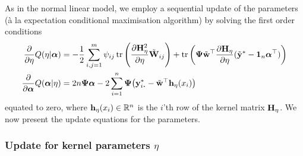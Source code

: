 As in the normal linear model, we employ a sequential update of the parameters (à la expectation conditional maximisation algorithm) by solving the first order conditions 
\begingroup
\setlength{\abovedisplayskip}{5pt}
\setlength{\belowdisplayskip}{8pt}
\begin{align}
  \frac{\partial}{\partial\eta}Q(\eta|\balpha)
  &= -\half \sum_{i,j=1}^m \psi_{ij} \tr \left( \frac{\partial \bH_\eta^2}{\partial\eta} \tilde\bW_{ij} \right) 
  + \tr\left( \bPsi \tilde\bw^\top  \frac{\partial \bH_\eta}{\partial\eta} (\tilde\by^* - \bone_n\balpha^\top)  \right) \label{eq:vemeta} \\
  \frac{\partial}{\partial\balpha}Q(\balpha|\eta)
  &= 2n\bPsi\balpha - 2 \sum_{i=1}^n \bPsi \big(\by_{i\bigcdot}^* - \tilde\bw^\top\bh_\eta(x_i) \big) \label{eq:vemalpha}
\end{align}
\endgroup
equated to zero, where ${\mathbf h}_\eta(x_i) \in \mathbb{R}^n$ is the $i$'th row of the kernel matrix ${\mathbf H}_\eta$.
We now present the update equations for the parameters.

\subsubsection{Update for kernel parameters $\eta$}

